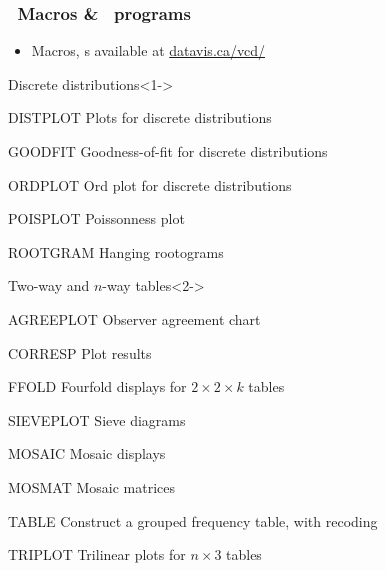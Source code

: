 \renewcommand{\FileName}{vcdmacros}

\begin{frame}
\frametitle{\VCD\ Macros \& \IML\ programs}
\begin{itemize}
\item Macros, \Dset{}s available at \url{datavis.ca/vcd/}
\end{itemize}

\begin{block}{Discrete distributions}<1->
\begin{proglist*}
	\item[DISTPLOT] Plots for discrete distributions 
	\item[GOODFIT] Goodness-of-fit for discrete distributions 
	\item[ORDPLOT] Ord plot for discrete distributions 
	\item[POISPLOT] Poissonness plot 
	\item[ROOTGRAM] Hanging rootograms 
\end{proglist*}
\end{block}

\begin{block}{Two-way and $n$-way tables}<2->
\begin{proglist*}
	\item[AGREEPLOT] Observer agreement chart 
	\item[CORRESP] Plot  results 
	\item[FFOLD] Fourfold displays for $2 \times 2 \times k$ tables
	\item[SIEVEPLOT] Sieve diagrams
	\item[MOSAIC] Mosaic displays 
	\item[MOSMAT] Mosaic matrices 
	\item[TABLE] Construct a grouped frequency table, with recoding 
	\item[TRIPLOT] Trilinear plots for $n \times 3$ tables 
\end{proglist*}
\end{block}
\end{frame}

